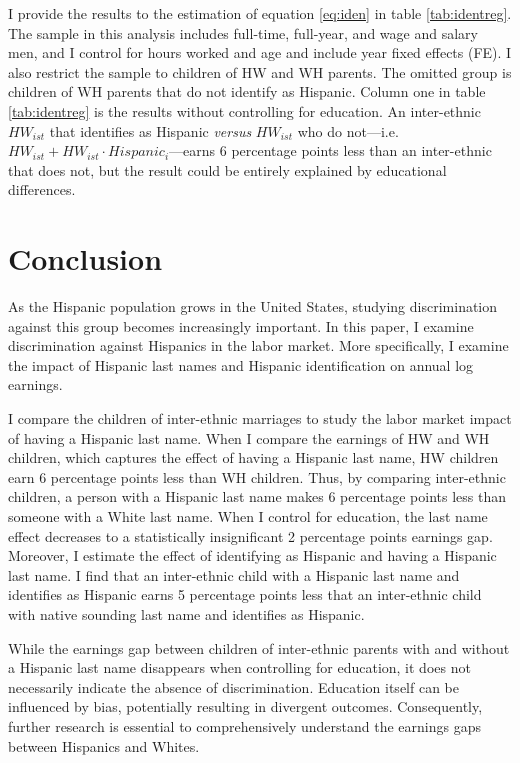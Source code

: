 \documentclass[12pt,english]{article}
\begin{document}
I provide the results to the estimation of equation \ref{eq:iden} in table \ref{tab:identreg}. The sample in this analysis includes full-time, full-year, and wage and salary men, and I control for hours worked and age and include year fixed effects (FE). I also restrict the sample to children of HW and WH parents. The omitted group is children of WH parents that do not identify as Hispanic. Column one in table \ref{tab:identreg} is the results without controlling for education. An inter-ethnic $HW_{ist}$ that identifies as Hispanic \textit{versus} $HW_{ist}$ who do not---i.e. $HW_{ist} + HW_{ist} \cdot Hispanic_i$---earns 6 percentage points less than an inter-ethnic that does not, but the result could be entirely explained by educational differences.


\section{Conclusion}\label{sec:con1}

As the Hispanic population grows in the United States, studying discrimination against this group becomes increasingly important. In this paper, I examine discrimination against Hispanics in the labor market. More specifically, I examine the impact of Hispanic last names and Hispanic identification on annual log earnings. 

I compare the children of inter-ethnic marriages to study the labor market impact of having a Hispanic last name. When I compare the earnings of HW and WH children, which captures the effect of having a Hispanic last name, HW children earn  6 percentage points less than WH children. Thus, by comparing inter-ethnic children, a person with a Hispanic last name makes 6 percentage points less than someone with a White last name. When I control for education, the last name effect decreases to a statistically insignificant 2 percentage points earnings gap. Moreover, I estimate the effect of identifying as Hispanic and having a Hispanic last name. I find that an inter-ethnic child with a Hispanic last name and identifies as Hispanic earns 5 percentage points less that an inter-ethnic child with native sounding last name and identifies as Hispanic. 

While the earnings gap between children of inter-ethnic parents with and without a Hispanic last name disappears when controlling for education, it does not necessarily indicate the absence of discrimination. Education itself can be influenced by bias, potentially resulting in divergent outcomes. Consequently, further research is essential to comprehensively understand the earnings gaps between Hispanics and Whites.
\end{document}
